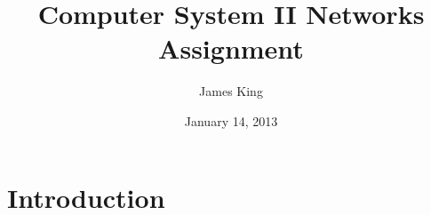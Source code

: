 \documentclass[a4paper]{article}
\title{Computer System II Networks Assignment}
\date{January 14, 2013}
\author{James King}
\begin{document}
\maketitle
\section{Introduction}
\end{document}
